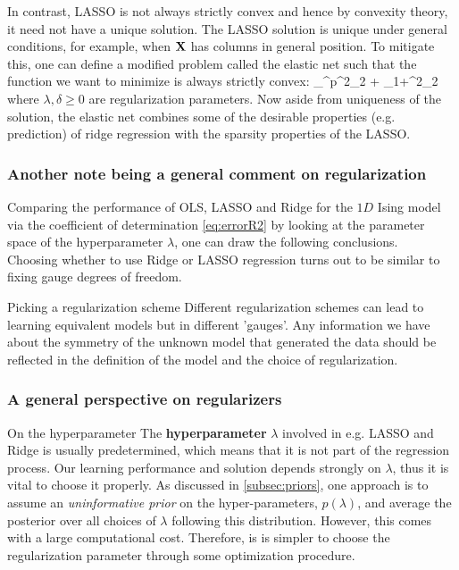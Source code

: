 In contrast, LASSO is not always strictly convex and hence by convexity theory, it need not have a unique solution. The LASSO solution is unique under general conditions, for example, when  $\mathbf{X}$  has columns in general position. To mitigate this, one can define a modified problem called the elastic net such that the function we want to minimize is always strictly convex:
\bse 
\min_{\mw \in \mR^p}\norm{\mX \mw -\my}^2_2 + \lambda \norm{\mw}_1+\delta \norm{\mw}^2_2
\ese 
where  $λ,δ\geq 0$  are regularization parameters. Now aside from uniqueness of the solution, the elastic net combines some of the desirable properties (e.g. prediction) of ridge regression with the sparsity properties of the LASSO.
\subsubsection{Another note being a general comment on regularization}
Comparing the performance of OLS, LASSO and Ridge for the $1D$ Ising model via the coefficient of determination \ref{eq:errorR2} by looking at the parameter space of the hyperparameter $\lambda$, one can draw the following conclusions.\\
Choosing whether to use Ridge or LASSO regression turns out to be similar to fixing gauge degrees of freedom.
\begin{mybox}{Picking a regularization scheme}
	Different regularization schemes can lead to learning equivalent models but in different ’gauges’. Any information we have about the symmetry of the unknown model that generated the data should be reflected in the definition of the model and the choice of regularization.
\end{mybox}

\subsubsection{A general perspective on regularizers}
\begin{mybox}{On the hyperparameter}
	The \textbf{hyperparameter} $\lambda$ involved in e.g. LASSO and Ridge is usually predetermined, which means that it is not part of the regression process. Our learning performance and solution depends strongly on $\lambda$, thus it is vital to choose it properly. As discussed in \ref{subsec:priors}, one approach is to assume an \emph{uninformative prior} on the hyper-parameters, $p(\lambda)$, and average the posterior over all choices of $\lambda$ following this distribution. However, this comes with a large computational cost. Therefore, is is simpler to choose the regularization parameter through some optimization procedure.
\end{mybox}






